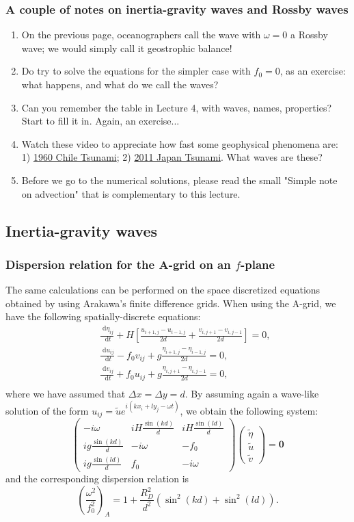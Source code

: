 \documentclass[xcolor=dvipsnames]{beamer} %
\newcommand{\BEQ}{ \begin{equation}}
\newcommand{\EEQ}{ \end{equation}}
\newcommand{\BSS}{ \begin{scriptsize}}
\newcommand{\ESS}{ \end{scriptsize}}
\newcommand{\ud}{\textrm{ d}}
\begin{document}
\frame
{
	\frametitle{A couple of notes on inertia-gravity waves and Rossby waves}
	\BSS
\begin{enumerate}
	\item On the previous page, oceanographers call the wave with $\omega=0$ a Rossby wave; we would simply call it geostrophic balance!
	\item Do try to solve the equations for the simpler case with $f_0=0$, as an exercise: what happens, and what do we call the waves?
	\item Can you remember the table in Lecture 4, with waves, names, properties? Start to fill it in. Again, an exercise...
	\item Watch these video to appreciate how fast some geophysical phenomena are: 1) \href{https://www.youtube.com/watch?v=oeKewmAoBEM}{1960 Chile Tsunami}; 2) \href{https://www.youtube.com/watch?v=jH3-hQjTGDQ}{2011 Japan Tsunami}. What waves are these?
	\item Before we go to the numerical solutions, please read the small "Simple note on advection" that is complementary to this lecture.
\end{enumerate}


\ESS }


\subsection{Inertia-gravity waves}
\frame
{
\frametitle{Dispersion relation for the A-grid on an $f$-plane}
\BSS
The same calculations can be performed on the space discretized equations obtained by using Arakawa's finite difference grids. When using the A-grid, we have the following spatially-discrete equations:
\begin{eqnarray*}
&&\frac{\ud \eta_{ij}}{\ud t} + H \left[ \frac{u_{i+1,j}-u_{i-1,j}}{2 d} + \frac{v_{i,j+1}-v_{i,j-1}}{2 d} \right] = 0,\\
&&\frac{\ud u_{ij}}{\ud t} - f_0 v_{ij} + g \frac{\eta_{i+1,j}-\eta_{i-1,j}}{2 d} = 0, \\
&&\frac{\ud v_{ij}}{\ud t} + f_0 u_{ij} + g \frac{\eta_{i,j+1}-\eta_{i,j-1}}{2 d} = 0, \\
\end{eqnarray*}
where we have assumed that $\Delta x = \Delta y = d$. By assuming again a wave-like solution of the form $u_{ij} = \tilde{u} e^{i(kx_i+ly_j-\omega t)}$, we obtain the following system:
\[
\left( \begin{array}{ccc}
-i \omega & iH\frac{\sin(kd)}{d} & iH\frac{\sin(ld)}{d} \\
ig\frac{\sin(kd)}{d} & -i \omega & -f_0 \\
ig\frac{\sin(ld)}{d} & f_0 & -i \omega 
\end{array} \right )
\left( \begin{array}{c} \tilde{\eta} \\ \tilde{u} \\ \tilde{v} \end{array} \right)
= 
\mathbf{0}
\]
and the corresponding dispersion relation is
\BEQ \label{disp_A}
\left(\frac{\omega^2}{f_0^2}\right)_A = 1 + \frac{R_D^2}{d^2} \left(\sin^2(kd) + \sin^2(ld)\right).
\EEQ
\ESS
}
\end{document}
